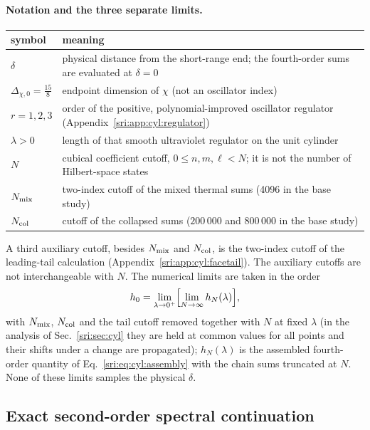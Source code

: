 \paragraph{Notation and the three separate limits.}
\begin{center}\small
\begin{tabular}{@{}l>{\raggedright\arraybackslash}p{}@{}}
\toprule
symbol & meaning\\
\midrule
$\delta$ & physical distance from the short-range end; the fourth-order sums are evaluated at $\delta=0$\\
$\Delta_{\chi,0}=\frac{15}{8}$ & endpoint dimension of $\chi$ (not an oscillator index)\\
$r=1,2,3$ & order of the positive, polynomial-improved oscillator regulator (Appendix~\ref{sri:app:cyl:regulator})\\
$\lambda>0$ & length of that smooth ultraviolet regulator on the unit cylinder\\
$N$ & cubical coefficient cutoff, $0\le n,m,\ell<N$; it is not the number of Hilbert-space states\\
$N_{\rm mix}$ & two-index cutoff of the mixed thermal sums (4096 in the base study)\\
$N_{\rm col}$ & cutoff of the collapsed sums ($200\,000$ and $800\,000$ in the base study)\\
\bottomrule
\end{tabular}
\end{center}
A third auxiliary cutoff, besides $N_{\rm mix}$ and $N_{\rm col}$, is the two-index cutoff of the leading-tail calculation (Appendix~\ref{sri:app:cyl:facetail}). The
auxiliary cutoffs are not interchangeable with $N$. The numerical limits are taken in the order
\begin{equation}
 h_0=\lim_{\lambda\to0^+}\Bigl[\lim_{N\to\infty}h_N(\lambda)\Bigr],
 \label{sri:eq:cyl:limits}
\end{equation}
with $N_{\rm mix}$, $N_{\rm col}$ and the tail cutoff removed together with $N$ at fixed $\lambda$ (in the analysis of
Sec.~\ref{sri:sec:cyl} they are held at common values for all points and their shifts under a change are propagated); $h_N(\lambda)$ is
the assembled fourth-order quantity of Eq.~\eqref{sri:eq:cyl:assembly} with the chain sums truncated at $N$. None of these
limits samples the physical $\delta$.

\subsection{Exact second-order spectral continuation}\label{sri:app:cyl:second}
